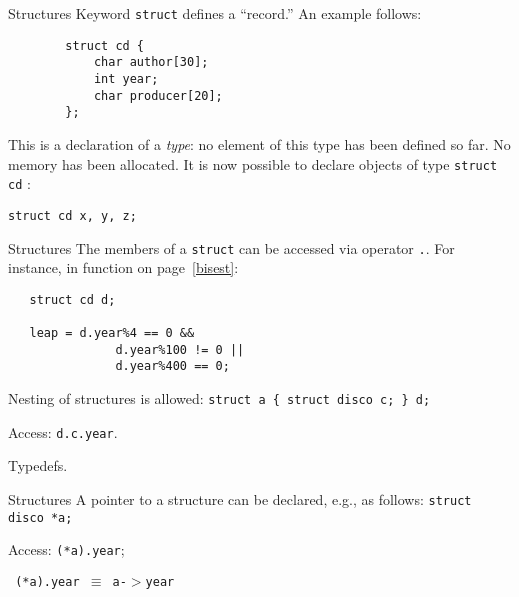 \begin{frame}[fragile]{Structures}
Keyword {\tt struct} defines a ``record.''
An example follows:

\vspace{20pt}


\begin{tt}
\begin{verbatim}
        struct cd {
            char author[30];
            int year;
            char producer[20];
        };
\end{verbatim}
\end{tt}


\vspace{20pt}

This is a declaration of a \emph{type}: no element
of this type has been defined so far. No memory
has been allocated. It is now possible to declare
objects of type {\tt struct cd} :
\begin{center}\tt struct cd x, y, z;\end{center}


\end{frame}
\begin{frame}[fragile]{Structures}
The members of a 
{\tt struct} can be accessed via operator
{\tt .}. For instance, in function on page~\ref{bisest}:


\vspace{20pt}

\begin{tt}
\begin{verbatim}
   struct cd d;

   leap = d.year%4 == 0 &&
               d.year%100 != 0 ||
               d.year%400 == 0;
\end{verbatim}
\end{tt}


\vspace{20pt}

Nesting of structures is allowed:
{\tt struct a \{ struct disco c; \} d;}


\vspace{20pt}

Access: {\tt d.c.year}.


\vspace{20pt}

Typedefs.

\end{frame}
\begin{frame}[fragile]{Structures}
A pointer to a structure can be declared, e.g., as follows:
{\tt struct disco *a;}

Access:
{\tt (*a).year};

\begin{center}\tt
(*a).year $\equiv$ a-$>$year
\end{center}


\end{frame}
